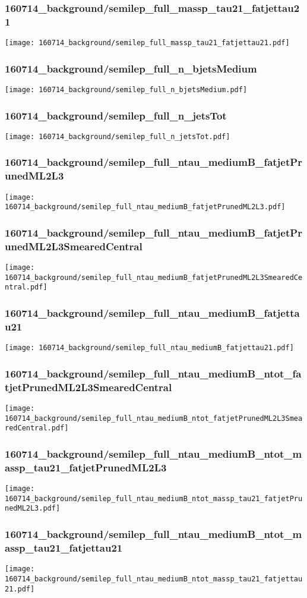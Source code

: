 \begin{frame}
   \frametitle{\small 160714\_background/semilep\_full\_massp\_tau21\_fatjettau21}
   \centering
   \texttt{[image: 160714\_background/semilep\_full\_massp\_tau21\_fatjettau21.pdf]}
\end{frame}

\begin{frame}
   \frametitle{\small 160714\_background/semilep\_full\_n\_bjetsMedium}
   \centering
   \texttt{[image: 160714\_background/semilep\_full\_n\_bjetsMedium.pdf]}
\end{frame}

\begin{frame}
   \frametitle{\small 160714\_background/semilep\_full\_n\_jetsTot}
   \centering
   \texttt{[image: 160714\_background/semilep\_full\_n\_jetsTot.pdf]}
\end{frame}

\begin{frame}
   \frametitle{\small 160714\_background/semilep\_full\_ntau\_mediumB\_fatjetPrunedML2L3}
   \centering
   \texttt{[image: 160714\_background/semilep\_full\_ntau\_mediumB\_fatjetPrunedML2L3.pdf]}
\end{frame}

\begin{frame}
   \frametitle{\small 160714\_background/semilep\_full\_ntau\_mediumB\_fatjetPrunedML2L3SmearedCentral}
   \centering
   \texttt{[image: 160714\_background/semilep\_full\_ntau\_mediumB\_fatjetPrunedML2L3SmearedCentral.pdf]}
\end{frame}

\begin{frame}
   \frametitle{\small 160714\_background/semilep\_full\_ntau\_mediumB\_fatjettau21}
   \centering
   \texttt{[image: 160714\_background/semilep\_full\_ntau\_mediumB\_fatjettau21.pdf]}
\end{frame}

\begin{frame}
   \frametitle{\small 160714\_background/semilep\_full\_ntau\_mediumB\_ntot\_fatjetPrunedML2L3SmearedCentral}
   \centering
   \texttt{[image: 160714\_background/semilep\_full\_ntau\_mediumB\_ntot\_fatjetPrunedML2L3SmearedCentral.pdf]}
\end{frame}

\begin{frame}
   \frametitle{\small 160714\_background/semilep\_full\_ntau\_mediumB\_ntot\_massp\_tau21\_fatjetPrunedML2L3}
   \centering
   \texttt{[image: 160714\_background/semilep\_full\_ntau\_mediumB\_ntot\_massp\_tau21\_fatjetPrunedML2L3.pdf]}
\end{frame}

\begin{frame}
   \frametitle{\small 160714\_background/semilep\_full\_ntau\_mediumB\_ntot\_massp\_tau21\_fatjettau21}
   \centering
   \texttt{[image: 160714\_background/semilep\_full\_ntau\_mediumB\_ntot\_massp\_tau21\_fatjettau21.pdf]}
\end{frame}

